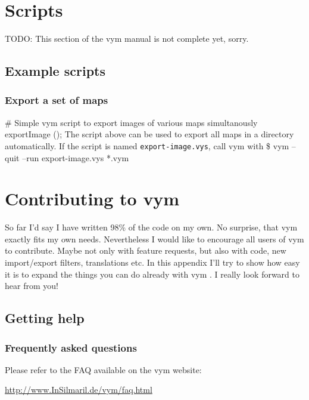 \documentclass[12pt,a4paper]{article}
\newcommand{\vym}{{\sc vym }}
\newenvironment{code}[1] { \verbatim #1}{\endverbatim  }
\begin{document}
\begin{appendix}
\section{Scripts} \label{scripts}   %

TODO: This section of the \vym manual is not complete yet, sorry.

\subsection{Example scripts}
\subsubsection{Export a set of maps}
\begin{code}
\# Simple vym script to export images of various maps simultanously
exportImage ();
\end{code}
The script above can be used to export all maps in a directory
automatically. If the script is named {\tt export-image.vys}, call \vym with
\begin{code}
\$ vym --quit --run export-image.vys *.vym
\end{code}


\section{Contributing to \vym}
So far I'd say I have written 98\% of the code on my own. No surprise,
that \vym exactly fits my own needs. Nevertheless I would like to
encourage all users of  \vym to contribute. Maybe not only with feature
requests, but also with code, new import/export filters, translations
etc. In this appendix I'll try to show how easy it is to expand the
things you can do already with \vym. I really look forward to hear from
you!

\subsection{Getting help}

\subsubsection*{Frequently asked questions}
Please refer to the FAQ available on the \vym website:
\begin{center}
\href{http://www.InSilmaril.de/vym/faq.html}{http://www.InSilmaril.de/vym/faq.html}
\end{center}


\end{appendix}
\end{document}
